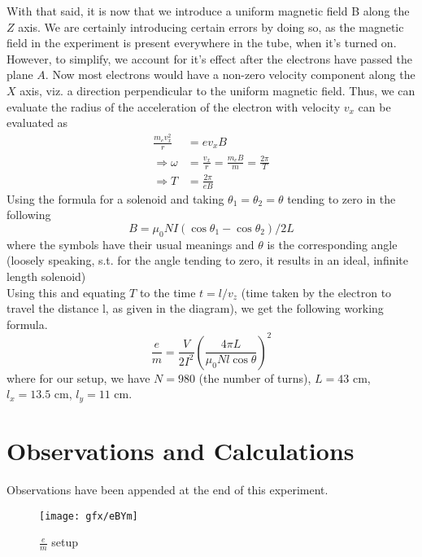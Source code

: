 	\par
	With that said, it is now that we introduce a uniform magnetic field B along the $Z$ axis. We are certainly introducing certain errors by doing so, as the magnetic field in the experiment is present everywhere in the tube, when it's turned on. However, to simplify, we account for it's effect after the electrons have passed the plane $A$. Now most electrons would have a non-zero velocity component along the $X$ axis, viz. a direction perpendicular to the uniform magnetic field. Thus, we can evaluate the radius of the acceleration of the electron with velocity $v_x$ can be evaluated as
	\begin{align}
		\frac {m_e v_x^2 } r &= e v_x B \\
		\Rightarrow \omega &= \frac {v_x} r = \frac {m_e B} {m}  = \frac {2 \pi} {T} \\		
		\Rightarrow T &=\frac {2\pi} {eB}		
	\end{align}
	Using the formula for a solenoid and taking $\theta_1 = \theta_2 = \theta$ tending to zero in the following
	\begin{equation}
		B = \mu_0 N I (\cos {\theta_1} - \cos{\theta_2})/2L
	\end{equation}
	where the symbols have their usual meanings and $\theta$ is the corresponding angle (loosely speaking, s.t. for the angle tending to zero, it results in an ideal, infinite length solenoid)\\
	Using this and equating $T$ to the time $t=l/v_z$ (time taken by the electron to travel the distance l, as given in the diagram), we get the following working formula.
	\begin{equation}
		\frac e m = \frac {V}{2I^2} \left( \frac {4 \pi L} {\mu_0 N l \cos {\theta}} \right) ^2
	\end{equation}		
	where for our setup, we have $N=980$ (the number of turns), $L=43$ cm, $l_x=13.5$ cm, $l_y=11$ cm.
\section{Observations and Calculations}
	Observations have been appended at the end of this experiment. \\


	\begin{figure}[bth]
		\begin{center}
			\texttt{[image: gfx/eBYm]}
		\end{center}
	\caption[$\frac e m $ setup]{$\frac e m$ setup}
	\label{eBYm}
	\end{figure}

